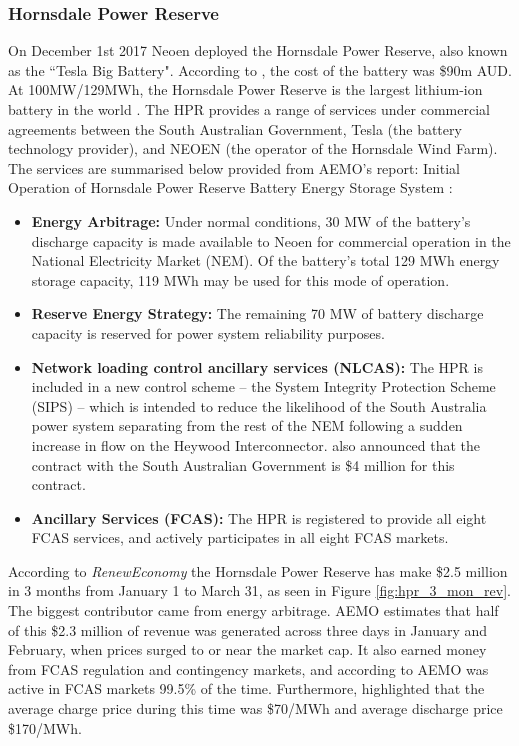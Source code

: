 \subsubsection{ Hornsdale Power Reserve }
On December 1st 2017 Neoen deployed the Hornsdale Power Reserve, also known as the ``Tesla Big Battery". According to \parencite{HornsdaleRenewEconomy}, the cost of the battery was \$90m AUD. At 100MW/129MWh, the Hornsdale Power Reserve is the largest lithium-ion battery in the world \parencite{HornsdaleWebsite}. The HPR provides a range of services under commercial agreements between the South Australian Government, Tesla (the battery technology provider), and NEOEN (the operator of the Hornsdale Wind Farm). The services are summarised below provided from AEMO's report: Initial Operation of Hornsdale Power Reserve Battery Energy Storage System \parencite{HornsdaleReport}:
\begin{itemize}
    \item \textbf{Energy Arbitrage:} Under normal conditions, 30 MW of the battery’s discharge capacity is made available to Neoen for commercial operation in the National Electricity Market (NEM). Of the battery’s total 129 MWh energy storage capacity, 119 MWh may be used for this mode of operation.
    \item \textbf{Reserve Energy Strategy:} The remaining 70 MW of battery discharge capacity is reserved for power system reliability purposes.
    \item \textbf{Network loading control ancillary services (NLCAS):} The HPR is included in a new control scheme – the System Integrity Protection Scheme (SIPS) – which is intended to reduce the likelihood of the South Australia power system separating from the rest of the NEM following a sudden increase in flow on the Heywood Interconnector. \parencite{HornsdaleRenewEconomy} also announced that the contract with the South Australian Government is \$4 million for this contract. 
    \item \textbf{Ancillary Services (FCAS):} The HPR is registered to provide all eight FCAS services, and actively participates in all eight FCAS markets.
\end{itemize}
According to \textit{RenewEconomy} the Hornsdale Power Reserve has make \$2.5 million  in 3 months from January 1 to March 31, as seen in Figure \ref{fig:hpr_3_mon_rev}. The biggest contributor came from energy arbitrage. AEMO estimates that half of this \$2.3 million of revenue was generated across three days in January and February, when prices surged to or near the market cap. It also earned money from FCAS regulation and contingency markets, and according to AEMO was active in FCAS markets 99.5\% of the time. Furthermore, \textcite{HornsdaleRenewEconomy} highlighted that the average charge price during this time was \$70/MWh and average discharge price \$170/MWh. 
